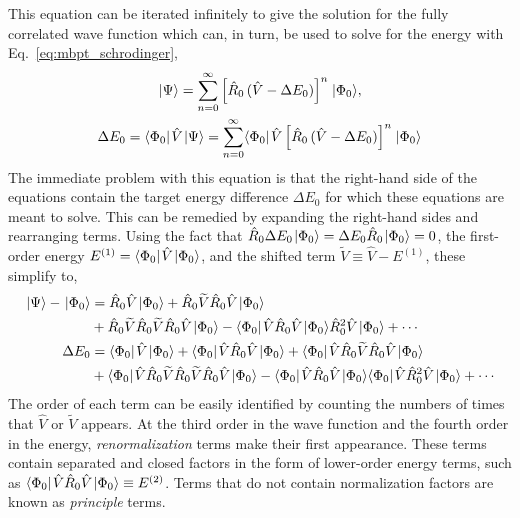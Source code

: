 \documentclass[thesis.tex]{subfiles}
\begin{document}
This equation can be iterated infinitely to give the solution for the fully correlated wave function which can, in turn, be used to solve for the energy with Eq.\ \eqref{eq:mbpt_schrodinger},
\begin{gather}
  \hspace{1pt}\lvert \Psi \rangle = \sum_{n=0}^{\infty}\left[\hat{R}_{0}\mathop{(\hat{V} - \Delta E_{0})}\right]^{n}\hspace{1pt}\lvert \Phi_{0} \rangle, \\
  \Delta E_{0} = \langle \Phi_{0} |\hspace{1pt}\hat{V}\hspace{1pt}\lvert \Psi \rangle = \sum_{n=0}^{\infty}\langle \Phi_{0} |\hspace{1pt}\hat{V}\left[\hat{R}_{0}\mathop{(\hat{V} - \Delta E_{0})}\right]^{n}\hspace{1pt}\lvert \Phi_{0} \rangle
\end{gather}
The immediate problem with this equation is that the right-hand side of the equations contain the target energy difference $\Delta E_{0}$ for which these equations are meant to solve.  This can be remedied by expanding the right-hand sides and rearranging terms.  Using the fact that $\hat{R}_{0}\Delta E_{0}\hspace{1pt}\lvert \Phi_{0} \rangle = \Delta E_{0}\hat{R}_{0}\hspace{1pt}\lvert \Phi_{0} \rangle = 0$, the first-order energy $E^{(1)} = \langle \Phi_{0} |\hspace{1pt}\hat{V}\hspace{1pt}\lvert \Phi_{0} \rangle$, and the shifted term $\widetilde{V} \equiv \hat{V} - E^{(1)}$, these simplify to,
\begin{align}
  \hspace{1pt}\lvert \Psi \rangle - \hspace{1pt}\lvert \Phi_{0} \rangle &= \hat{R}_{0}\hat{V}\hspace{1pt}\lvert \Phi_{0} \rangle + \hat{R}_{0}\widetilde{V}\hat{R}_{0}\hat{V}\hspace{1pt}\lvert \Phi_{0} \rangle \notag \\
  &+ \hat{R}_{0}\widetilde{V}\hat{R}_{0}\widetilde{V}\hat{R}_{0}\hat{V}\hspace{1pt}\lvert \Phi_{0} \rangle - \langle \Phi_{0} |\hspace{1pt}\hat{V}\hat{R}_{0}\hat{V}\hspace{1pt}\lvert \Phi_{0} \rangle\hat{R}^{2}_{0}\hat{V}\hspace{1pt}\lvert \Phi_{0} \rangle + \cdots \\
  \Delta E_{0} &= \langle \Phi_{0} |\hspace{1pt}\hat{V}\hspace{1pt}\lvert \Phi_{0} \rangle + \langle \Phi_{0} |\hspace{1pt}\hat{V}\hat{R}_{0}\hat{V}\hspace{1pt}\lvert \Phi_{0} \rangle + \langle \Phi_{0} |\hspace{1pt}\hat{V}\hat{R}_{0}\widetilde{V}\hat{R}_{0}\hat{V}\hspace{1pt}\lvert \Phi_{0} \rangle \notag \\
  &+ \langle \Phi_{0} |\hspace{1pt}\hat{V}\hat{R}_{0}\widetilde{V}\hat{R}_{0}\widetilde{V}\hat{R}_{0}\hat{V}\hspace{1pt}\lvert \Phi_{0} \rangle - \langle \Phi_{0} |\hspace{1pt}\hat{V}\hat{R}_{0}\hat{V}\hspace{1pt}\lvert \Phi_{0} \rangle\langle \Phi_{0} |\hspace{1pt}\hat{V}\hat{R}^{2}_{0}\hat{V}\hspace{1pt}\lvert \Phi_{0} \rangle + \cdots
\end{align}
The order of each term can be easily identified by counting the numbers of times that $\hat{V}$ or $\widetilde{V}$ appears.  At the third order in the wave function and the fourth order in the energy, \textit{renormalization} terms make their first appearance.  These terms contain separated and closed factors in the form of lower-order energy terms, such as $\langle \Phi_{0} |\hspace{1pt}\hat{V}\hat{R}_{0}\hat{V}\hspace{1pt}\lvert \Phi_{0} \rangle \equiv E^{(2)}$.  Terms that do not contain normalization factors are known as \textit{principle} terms.
\end{document}

